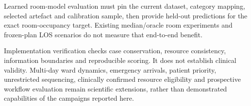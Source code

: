 Learned room-model evaluation must pin the current dataset, category mapping,
selected artefact and calibration sample, then provide held-out predictions
for the exact room-occupancy target. Existing median/oracle room experiments
and frozen-plan LOS scenarios do not measure that end-to-end benefit.

Implementation verification checks case conservation, resource consistency,
information boundaries and reproducible scoring. It does not establish
clinical validity. Multi-day ward dynamics, emergency arrivals, patient
priority, unrestricted sequencing, clinically confirmed resource eligibility
and prospective workflow evaluation remain scientific extensions, rather
than demonstrated capabilities of the campaigns reported here.
